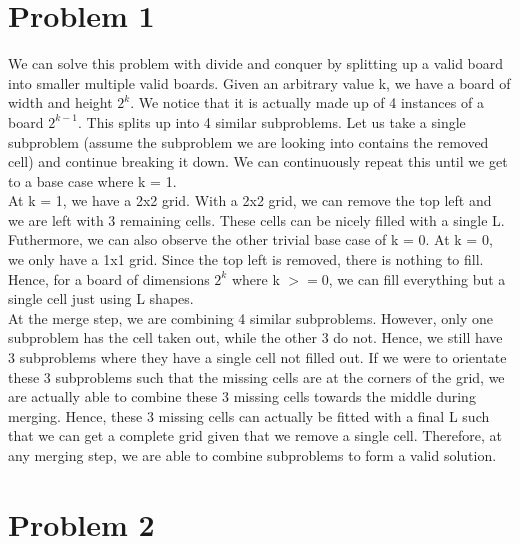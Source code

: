 \documentclass[12pt,letterpaper]{article}
\begin{document}
\newpage

\section*{Problem 1}

We can solve this problem with divide and conquer by
splitting up a valid board into smaller multiple valid boards.
Given an arbitrary value k, we have a board of width and height $2^k$.
We notice that it is actually made up of 4 instances of a board $2^{k - 1}$. 
This splits up into 4 similar subproblems. 
Let us take a single subproblem (assume the subproblem we are looking into contains the removed cell) and continue breaking it down. 
We can continuously repeat this until we get to a base case where k = 1. \\

At k = 1, we have a 2x2 grid.
With a 2x2 grid, we can remove the top left and we are left with 3 remaining cells. 
These cells can be nicely filled with a single L.
Futhermore, we can also observe the other trivial base case of k = 0.
At k = 0, we only have a 1x1 grid.
Since the top left is removed, there is nothing to fill.
Hence, for a board of dimensions $2^k$ where k $>= 0$, we can fill everything but a single cell just using L shapes. \\

At the merge step, we are combining 4 similar subproblems.
However, only one subproblem has the cell taken out, while the other 3 do not.
Hence, we still have 3 subproblems where they have a single cell not filled out. 
If we were to orientate these 3 subproblems such that 
the missing cells are at the corners of the grid, 
we are actually able to combine these 3 missing cells towards the middle during merging.
Hence, these 3 missing cells can actually be fitted with a final L such that we can get a complete grid given that we remove a single cell.
Therefore, at any merging step, we are able to combine subproblems to form a valid solution.

\newpage

\section*{Problem 2}
\end{document}
